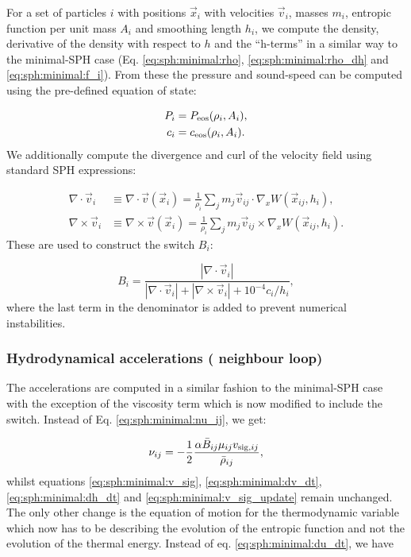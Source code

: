 For a set of particles $i$ with positions $\vec{x}_i$ with velocities
$\vec{v}_i$, masses $m_i$, entropic function per unit mass $A_i$ and
smoothing length $h_i$, we compute the density, derivative of the density with respect
to $h$ and the ``h-terms'' in a similar way to the minimal-SPH case
(Eq. \ref{eq:sph:minimal:rho}, \ref{eq:sph:minimal:rho_dh} and
\ref{eq:sph:minimal:f_i}). From these the pressure and sound-speed can
be computed using the pre-defined equation of state:

\begin{align}
  P_i &= P_{\rm eos}(\rho_i, A_i),   \label{eq:sph:gadget2:P}\\
  c_i &= c_{\rm eos}(\rho_i, A_i).   \label{eq:sph:gadget2:c}
\end{align}
We additionally compute the divergence and
curl of the velocity field using standard SPH expressions:

\begin{align}
  \nabla\cdot\vec{v}_i &\equiv\nabla\cdot \vec{v}(\vec{x}_i) = \frac{1}{\rho_i} \sum_j m_j
  \vec{v}_{ij}\cdot\nabla_x W(\vec{x}_{ij}, h_i) \label{eq:sph:gadget2:div_v},\\ 
    \nabla\times\vec{v}_i &\equiv \nabla\times \vec{v}(\vec{x}_i) = \frac{1}{\rho_i} \sum_j m_j
  \vec{v}_{ij}\times\nabla_x W(\vec{x}_{ij}, h_i) \label{eq:sph:gadget2:rot_v}.
\end{align}
These are used to construct the \cite{Balsara1995} switch $B_i$:

\begin{equation}
  B_i = \frac{|\nabla\cdot\vec{v}_i|}{|\nabla\cdot\vec{v}_i| +
    |\nabla\times\vec{v}_i| + 10^{-4}c_i / h_i}, \label{eq:sph:gadget2:balsara}
\end{equation}
where the last term in the denominator is added to prevent numerical instabilities.

\subsubsection{Hydrodynamical accelerations ( neighbour loop)}

The accelerations are computed in a similar fashion to the minimal-SPH
case with the exception of the viscosity term which is now modified to
include the switch. Instead of Eq. \ref{eq:sph:minimal:nu_ij}, we get:

\begin{equation}
\nu_{ij} = -\frac{1}{2}\frac{\alpha \bar B_{ij} \mu_{ij} v_{{\rm sig},ij}}{\bar\rho_{ij}},
  \label{eq:sph:gadget2:nu_ij}  
\end{equation}
whilst equations \ref{eq:sph:minimal:v_sig},
\ref{eq:sph:minimal:dv_dt}, \ref{eq:sph:minimal:dh_dt} and
\ref{eq:sph:minimal:v_sig_update} remain unchanged. The only other
change is the equation of motion for the thermodynamic variable which
now has to be describing the evolution of the entropic function and
not the evolution of the thermal energy. Instead of
eq. \ref{eq:sph:minimal:du_dt}, we have

